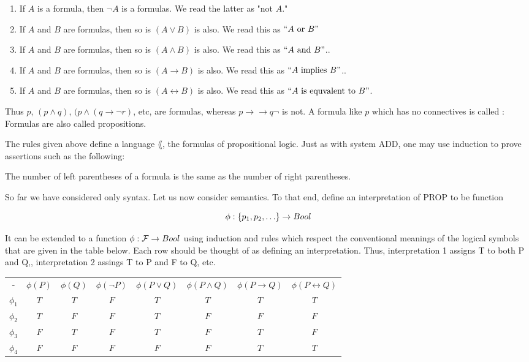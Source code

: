 \begin{enumerate}

\item If $A$ is a formula, then $\neg A$ is a formulas.  We read the latter as "not $A$."

\item If $A$ and $B$ are formulas, then so is $(A \lor B)$ is also. We read this as $``A \text{ or } B"$

\item If $A$ and $B$ are formulas, then so is $(A \land B)$ is also. We read this as $``A \text{ and } B"$..

\item If $A$ and $B$ are formulas, then so is $(A \to B)$ is also. We read this as $``A \text{ implies } B"$..

\item If $A$ and $B$ are formulas, then so is $(A \leftrightarrow B)$ is also. We read this as $``A \text{ is equvalent to } B"$.
\end{enumerate}

Thus $p$, $(p \land q)$, $(p \land (q \to \neg r)$, etc, are formulas, whereas $p \to \to q \neg$ is not.  A formula like $p$ which has no connectives is called :  Formulas are also called propositions.

The rules given above define a language $\lang$, the formulas of propositional logic.  Just as with system ADD, one may use induction to prove assertions such as the following:

\begin{proposition}
The number of left parentheses of a formula is the same as the number of right parentheses.
\end{proposition}

So far we have considered only syntax.  Let us now consider semantics.
To that end, define an interpretation of PROP to be function

\begin{equation}
\phi: \set{p_1, p_2, \dots} \to Bool
\end{equation}

It can be extended to a function $\phi: \mathcal{F} \to Bool$ using induction and rules which respect the conventional meanings of the logical symbols that are given in the table below.  Each row should be thought of as defining an interpretation. Thus, interpretation 1 assigns T to both P and Q,, interpretation 2 assings T to P and F to Q, etc.

\begin{indent}
\begin{tabular}{cccccccc}
- & $\phi(P)$ & $\phi(Q)$ & $\phi(\neg P)$ & $\phi(P \lor Q)$ & $\phi(P \land Q)$ & $\phi(P \to Q)$ & $\phi(P \leftrightarrow Q)$ \\
$\phi_1$ & $T$ & $T$ & $F$ & $T$ & $T$ & $T$ & $T$ \\
$\phi_2$ & $T$ & $F$ & $F$ & $T$ & $F$ & $F$ & $F$ \\
$\phi_3$ & $F$ & $T$ & $F$ & $T$ & $F$ & $T$ & $F$ \\
$\phi_4$ &$F$ & $F$ & $F$ & $F$ & $F$ & $T$ & $T $ \\
\end{tabular}
\end{indent}

